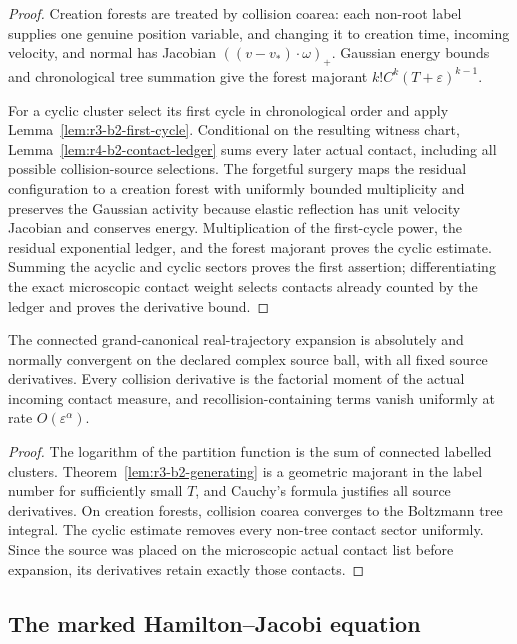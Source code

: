 \begin{proof}
Creation forests are treated by collision coarea: each non-root label supplies
one genuine position variable, and changing it to creation time, incoming
velocity, and normal has Jacobian
\(((v-v_*)\cdot\omega)_+\).  Gaussian energy bounds and chronological tree
summation give the forest majorant
\(k!C^k(T+\varepsilon)^{k-1}\).

For a cyclic cluster select its first cycle in chronological order and apply
Lemma~\ref{lem:r3-b2-first-cycle}.  Conditional on the resulting witness
chart, Lemma~\ref{lem:r4-b2-contact-ledger} sums every later actual contact,
including all possible collision-source selections.  The forgetful surgery
maps the residual configuration to a creation forest with uniformly bounded
multiplicity and preserves the Gaussian activity because elastic reflection
has unit velocity Jacobian and conserves energy.  Multiplication of the
first-cycle power, the residual exponential ledger, and the forest majorant
proves the cyclic estimate.  Summing the acyclic and cyclic sectors proves the
first assertion; differentiating the exact microscopic contact weight selects
contacts already counted by the ledger and proves the derivative bound.
\end{proof}

\begin{corollary}
\label{thm:r3-b2-gc-cluster}
The connected grand-canonical real-trajectory expansion is absolutely and
normally convergent on the declared complex source ball, with all fixed source
derivatives.  Every collision derivative is the factorial moment of the
actual incoming contact measure, and recollision-containing terms vanish
uniformly at rate \(O(\varepsilon^\alpha)\).
\end{corollary}

\begin{proof}
The logarithm of the partition function is the sum of connected labelled
clusters.  Theorem~\ref{lem:r3-b2-generating} is a geometric majorant in the
label number for sufficiently small \(T\), and Cauchy's formula justifies all
source derivatives.  On creation forests, collision coarea converges to the
Boltzmann tree integral.  The cyclic estimate removes every non-tree contact
sector uniformly.  Since the source was placed on the microscopic actual
contact list before expansion, its derivatives retain exactly those contacts.
\end{proof}

\subsection{The marked Hamilton--Jacobi equation}

